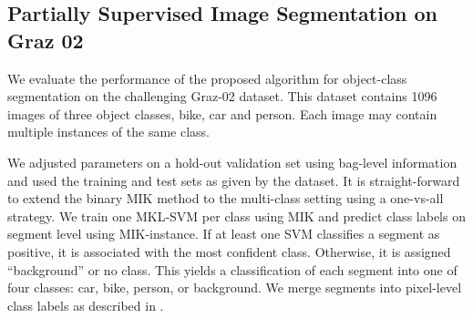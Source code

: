 \subsection{Partially Supervised Image Segmentation on Graz 02}

We evaluate the performance of the proposed algorithm for object-class
segmentation on the challenging Graz-02 dataset.
This dataset contains 1096 images of three object classes, bike, car and person.
Each image may contain multiple instances of the same class.

We adjusted parameters on a hold-out validation set using bag-level information and used the
training and test sets as given by the dataset.
It is straight-forward to extend the binary MIK method to the multi-class
setting using a one-vs-all strategy.
We train one MKL-SVM per class using MIK and predict class labels on segment level
using MIK-instance. If at least one SVM classifies a segment as positive,
it is associated with the most confident class. Otherwise, it is assigned
``background'' or no class.
This yields a classification of each segment into one of four classes: car, bike, person,
or background. We merge segments into pixel-level class labels as described
in .

